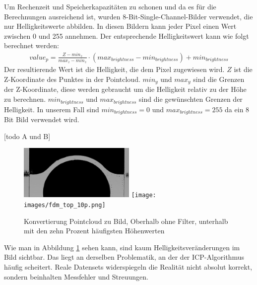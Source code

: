 Um Rechenzeit und Speicherkapazitäten zu schonen und 
da es für die Berechnungen ausreichend ist, wurden 
8-Bit-Single-Channel-Bilder verwendet, die nur Helligkeitswerte abbilden. 
In diesen Bildern kann jeder Pixel einen Wert zwischen 0 und 255 annehmen. 
Der entsprechende Helligkeitswert kann wie folgt berechnet werden:
\begin{align}\label{calc:brightness}
    value_p = \frac{Z - min_z}{max_z - min_z} \cdot (max_{brightness} - min_{brightness}) + min_{brightness}
\end{align}
Der resultierende Wert ist die Helligkeit, die dem Pixel zugewiesen wird.
$Z$ ist die Z-Koordinate des Punktes in der Pointcloud. $min_y$ und $max_y$ sind 
die Grenzen der Z-Koordinate, diese werden gebraucht um die Helligkeit relativ 
zu der Höhe zu berechnen. $min_{brightness}$ und $max_{brightness}$ sind die gewünschten Grenzen der 
Helligkeit. In unserem Fall sind $min_{brightness} = 0$ und $max_{brightness} = 255$ da ein 8 Bit Bild
verwendet wird.

[todo A und B]
\begin{figure}[h]
    \centering
    \includegraphics[width=0.5\textwidth]{images/fdm_top_100p.png}
    \texttt{[image: images/fdm\_top\_10p.png]}
    \caption{Konvertierung Pointcloud zu Bild, Oberhalb ohne Filter, unterhalb 
    mit den zehn Prozent häufigsten Höhenwerten}
    \label{fig:image_from_pc}
\end{figure}

Wie man in Abbildung \ref{fig:image_from_pc} sehen kann, sind kaum Helligkeitsveränderungen
im Bild sichtbar. Das liegt an derselben Problematik, an der der ICP-Algorithmus häufig
scheitert. Reale Datensets widerspiegeln die Realität nicht absolut korrekt, sondern
beinhalten Messfehler und Streuungen.

